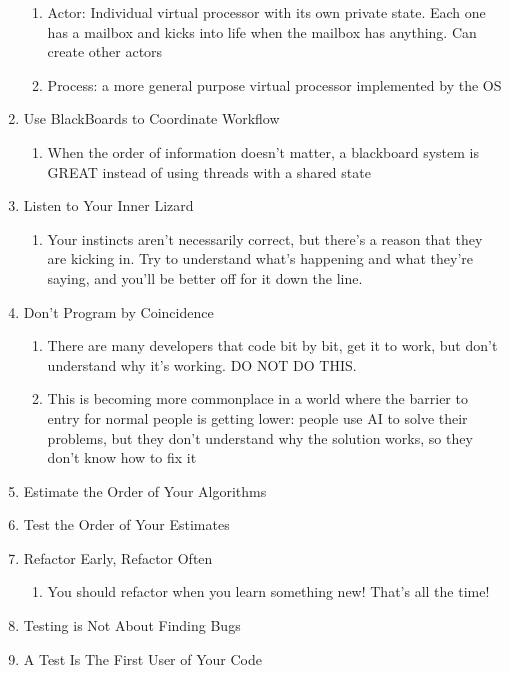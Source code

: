 \documentclass{article}
\begin{document}
\begin{enumerate}
\begin{enumerate}
            \item Actor: Individual virtual processor with its own private state. Each one has a mailbox and kicks into life when the mailbox has anything. Can create other actors
            \item Process: a more general purpose virtual processor implemented by the OS
        \end{enumerate}
    \item Use BlackBoards to Coordinate Workflow
        \begin{enumerate}
            \item When the order of information doesn't matter, a blackboard system is GREAT instead of using threads with a shared state
        \end{enumerate}
    \item Listen to Your Inner Lizard
        \begin{enumerate}
            \item Your instincts aren't necessarily correct, but there's a reason that they are kicking in. Try to understand what's happening and what they're saying, and you'll be better off for it down the line.
        \end{enumerate}
    \item Don't Program by Coincidence
        \begin{enumerate}
            \item There are many developers that code bit by bit, get it to work, but don't understand why it's working. DO NOT DO THIS. 
            \item This is becoming more commonplace in a world where the barrier to entry for normal people is getting lower: people use AI to solve their problems, but they don't understand why the solution works, so they don't know how to fix it
        \end{enumerate}
    \item Estimate the Order of Your Algorithms
    \item Test the Order of Your Estimates
    \item Refactor Early, Refactor Often
        \begin{enumerate}
            \item You should refactor when you learn something new! That's all the time!
        \end{enumerate}
    \item Testing is Not About Finding Bugs
    \item A Test Is The First User of Your Code

\end{enumerate}
\end{document}
